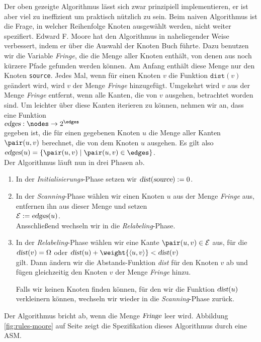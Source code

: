 \noindent
Der oben gezeigte Algorithmus l\"asst sich zwar prinzipiell implementieren, er ist aber 
viel zu ineffizient um praktisch n\"utzlich zu sein.
Beim naiven Algorithmus ist die Frage, in welcher Reihenfolge Knoten ausgew\"ahlt werden,
nicht weiter spezifiert.   Edward F. Moore \cite{moore:59} hat den Algorithmus in naheliegender Weise
verbessert,  indem er \"uber die Auswahl der Knoten Buch f\"uhrte.  
Dazu benutzen wir die Variable \textsl{Fringe}, die die Menge aller Knoten enth\"alt, von denen aus
noch k\"urzere Pfade gefunden werden k\"onnen.  Am Anfang enth\"alt diese Menge nur den Knoten
\texttt{source}.  Jedes Mal, wenn f\"ur einen Knoten $v$ die Funktion
$\mathtt{dist}(v)$ ge\"andert wird, wird $v$ der Menge \textsl{Fringe} hinzugef\"ugt.
Umgekehrt wird $v$ aus der Menge \textsl{Fringe} entfernt, wenn alle Kanten, die von $v$
ausgehen, betrachtet worden sind.  Um leichter \"uber diese Kanten iterieren zu k\"onnen,
nehmen wir an, dass eine Funktion \\[0.2cm]
\hspace*{1.3cm} $\textsl{edges}: \nodes \rightarrow 2^{\edges}$ \\[0.2cm]
gegeben ist, die f\"ur einen gegebenen Knoten $u$ die Menge aller Kanten $\pair(u,v)$
berechnet, die von dem Knoten $u$ ausgehen.  Es gilt also \\[0.2cm]
\hspace*{1.3cm} $\textsl{edges}(u) = \{ \pair(u,v) \mid \pair(u,v) \in \edges \}$.
\\[0.2cm]
Der Algorithmus l\"auft nun in drei Phasen ab.
\begin{enumerate}
\item In der \emph{Initialisierungs}-Phase setzen wir $\textsl{dist}(\textsl{source}) := 0$.
\item In der \emph{Scanning}-Phase w\"ahlen wir einen Knoten $u$ aus der Menge \textsl{Fringe} aus,
      entfernen ihn aus dieser Menge und setzen \\[0.2cm]
      \hspace*{1.3cm} ${\cal E} := \textsl{edges}(u)$. \\[0.2cm]
      Ansschlie{\ss}end wechseln wir in die \emph{Relabeling}-Phase.
\item In der \emph{Relabeling}-Phase w\"ahlen wir eine Kante 
      $\pair(u,v) \in {\cal E}$ aus, f\"ur die \\[0.2cm]
      \hspace*{1.3cm} $\textsl{dist}(v)=\Omega$ \quad oder \quad
      $\textsl{dist}(u) + \weight{\langle{}u,v\rangle} < \textsl{dist}(v)$ \\[0.2cm]
      gilt.  Dann \"andern wir die Abstands-Funktion \textsl{dist} f\"ur den Knoten $v$ ab
      und f\"ugen gleichzeitig den Knoten $v$ der Menge \textsl{Fringe} hinzu.

      Falls wir keinen Knoten finden k\"onnen, f\"ur den wir die 
      Funktion $\textsl{dist}(u)$ verkleinern k\"onnen, wechseln wir wieder in die \emph{Scanning}-Phase zur\"uck.
\end{enumerate}
Der Algorithmus bricht ab, wenn die Menge $\textsl{Fringe}$ leer wird.
Abbildung \ref{fig:rules-moore} auf Seite \pageref{fig:rules-moore} zeigt die
Spezifikation dieses Algorithmus durch eine ASM.

